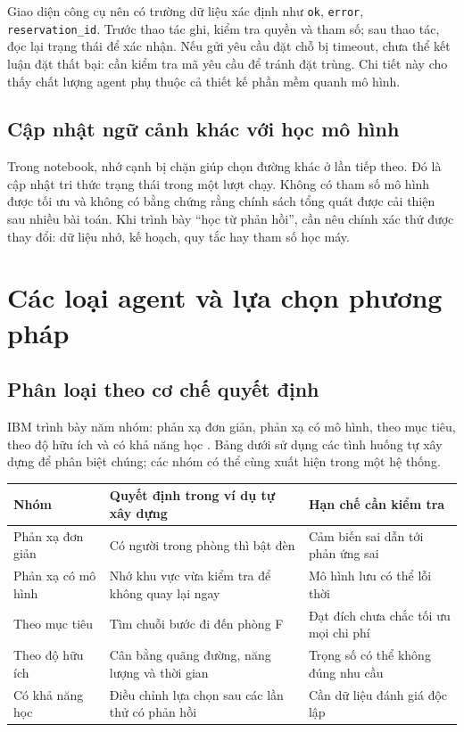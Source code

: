 \documentclass[12pt,a4paper]{article}
\begin{document}
Giao diện công cụ nên có trường dữ liệu xác định như \texttt{ok}, \texttt{error},
\texttt{reservation\_id}. Trước thao tác ghi, kiểm tra quyền và tham số; sau thao tác,
đọc lại trạng thái để xác nhận. Nếu gửi yêu cầu đặt chỗ bị timeout, chưa thể kết luận
đặt thất bại: cần kiểm tra mã yêu cầu để tránh đặt trùng. Chi tiết này cho thấy chất
lượng agent phụ thuộc cả thiết kế phần mềm quanh mô hình.

\subsection{Cập nhật ngữ cảnh khác với học mô hình}
Trong notebook, nhớ cạnh bị chặn giúp chọn đường khác ở lần tiếp theo. Đó là cập nhật
tri thức trạng thái trong một lượt chạy. Không có tham số mô hình được tối ưu và không
có bằng chứng rằng chính sách tổng quát được cải thiện sau nhiều bài toán. Khi trình bày
``học từ phản hồi'', cần nêu chính xác thứ được thay đổi: dữ liệu nhớ, kế hoạch, quy tắc
hay tham số học máy.

\par
\section{Các loại agent và lựa chọn phương pháp}
\subsection{Phân loại theo cơ chế quyết định}
IBM trình bày năm nhóm: phản xạ đơn giản, phản xạ có mô hình, theo mục tiêu,
theo độ hữu ích và có khả năng học \cite{ibm}. Bảng dưới sử dụng các tình huống
tự xây dựng để phân biệt chúng; các nhóm có thể cùng xuất hiện trong một hệ thống.

\begin{center}\small
\begin{tabularx}{\linewidth}{@{}p{2.8cm}XX@{}}
\toprule
\textbf{Nhóm} & \textbf{Quyết định trong ví dụ tự xây dựng} & \textbf{Hạn chế cần kiểm tra}\\
\midrule
Phản xạ đơn giản & Có người trong phòng thì bật đèn & Cảm biến sai dẫn tới phản ứng sai\\
Phản xạ có mô hình & Nhớ khu vực vừa kiểm tra để không quay lại ngay & Mô hình lưu có thể lỗi thời\\
Theo mục tiêu & Tìm chuỗi bước đi đến phòng F & Đạt đích chưa chắc tối ưu mọi chi phí\\
Theo độ hữu ích & Cân bằng quãng đường, năng lượng và thời gian & Trọng số có thể không đúng nhu cầu\\
Có khả năng học & Điều chỉnh lựa chọn sau các lần thử có phản hồi & Cần dữ liệu đánh giá độc lập\\
\bottomrule
\end{tabularx}
\end{center}
\end{document}
